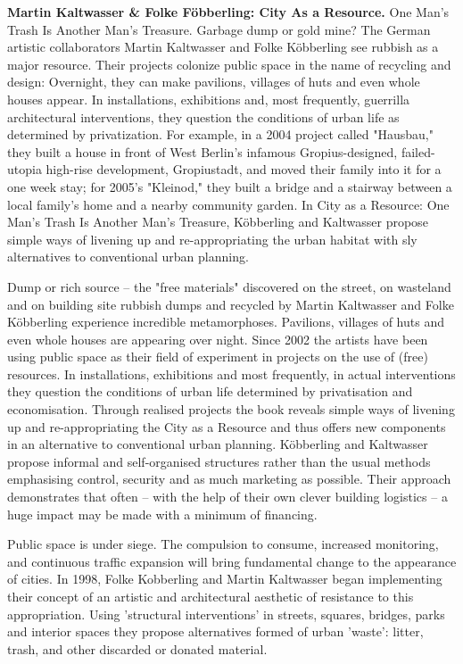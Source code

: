 \textbf{Martin Kaltwasser \& Folke Föbberling: City As a Resource.} One Man's Trash Is Another Man's Treasure. Garbage dump or gold mine? The German artistic collaborators Martin Kaltwasser and Folke Köbberling see rubbish as a major resource. Their projects colonize public space in the name of recycling and design: Overnight, they can make pavilions, villages of huts and even whole houses appear. In installations, exhibitions and, most frequently, guerrilla architectural interventions, they question the conditions of urban life as determined by privatization. For example, in a 2004 project called "Hausbau," they built a house in front of West Berlin's infamous Gropius-designed, failed-utopia high-rise development, Gropiustadt, and moved their family into it for a one week stay; for 2005's "Kleinod," they built a bridge and a stairway between a local family's home and a nearby community garden. In City as a Resource: One Man's Trash Is Another Man's Treasure, Köbberling and Kaltwasser propose simple ways of livening up and re-appropriating the urban habitat with sly alternatives to conventional urban planning.

Dump or rich source – the "free materials" discovered on the street, on wasteland and on building site rubbish dumps and recycled by Martin Kaltwasser and Folke Köbberling experience incredible metamorphoses. Pavilions, villages of huts and even whole houses are appearing over night. Since 2002 the artists have been using public space as their field of experiment in projects on the use of (free) resources. In installations, exhibitions and most frequently, in actual interventions they question the conditions of urban life determined by privatisation and economisation. Through realised projects the book reveals simple ways of livening up and re-appropriating the City as a Resource and thus offers new components in an alternative to conventional urban planning. Köbberling and Kaltwasser propose informal and self-organised structures rather than the usual methods emphasising control, security and as much marketing as possible. Their approach demonstrates that often – with the help of their own clever building logistics – a huge impact may be made with a minimum of financing.

Public space is under siege. The compulsion to consume, increased monitoring, and continuous traffic expansion will bring fundamental change to the appearance of cities. In 1998, Folke Kobberling and Martin Kaltwasser began implementing their concept of an artistic and architectural aesthetic of resistance to this appropriation. Using 'structural interventions' in streets, squares, bridges, parks and interior spaces they propose alternatives formed of urban 'waste': litter, trash, and other discarded or donated material. 

